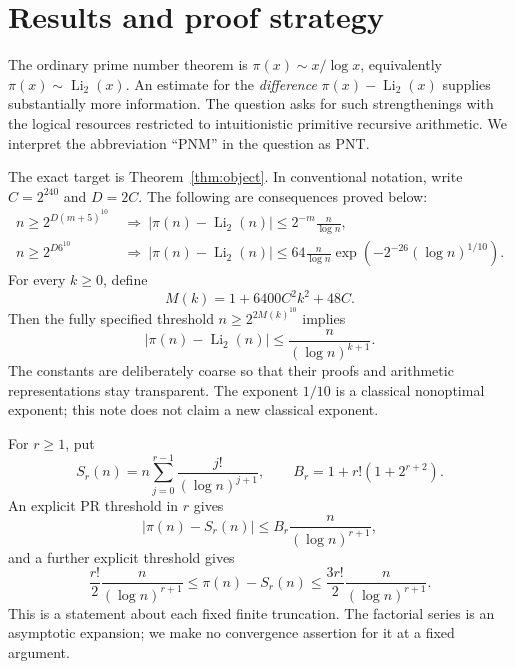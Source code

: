 \documentclass[11pt,letterpaper]{article}
\numberwithin{equation}{section}
\theoremstyle{definition}
\newcommand{\Li}{\operatorname{Li}}
\begin{document}
\begingroup
\small
\setlength{\parskip}{0pt}
\tableofcontents
\endgroup
\newpage
{}

\section{Results and proof strategy}

The ordinary prime number theorem is
$\pi(x)\sim x/\log x$, equivalently $\pi(x)\sim\Li_2(x)$.
An estimate for the \emph{difference} $\pi(x)-\Li_2(x)$ supplies
substantially more information. The question asks for such strengthenings
with the logical resources restricted to intuitionistic primitive recursive
arithmetic. We interpret the abbreviation ``PNM'' in the question as PNT.

The exact target is Theorem~\ref{thm:object}. In conventional notation,
write $C=2^{240}$ and $D=2C$. The following are consequences proved below:
\begin{align*}
 n\ge2^{D(m+5)^{10}}
 &\ \Longrightarrow\
 |\pi(n)-\Li_2(n)|\le2^{-m}\frac n{\log n},\\
 n\ge2^{D6^{10}}
 &\ \Longrightarrow\
 |\pi(n)-\Li_2(n)|\le
 64\frac n{\log n}\exp\!\left(-2^{-26}(\log n)^{1/10}\right).
\end{align*}
For every $k\ge0$, define
\[
 M(k)=1+6400C^2k^2+48C.
\]
Then the fully specified threshold
$n\ge2^{2M(k)^{10}}$ implies
\[
 |\pi(n)-\Li_2(n)|\le \frac n{(\log n)^{k+1}}.
\]
The constants are deliberately coarse so that their proofs and arithmetic
representations stay transparent. The exponent $1/10$ is a classical
nonoptimal exponent; this note does not claim a new classical exponent.

For $r\ge1$, put
\[
 S_r(n)=n\sum_{j=0}^{r-1}\frac{j!}{(\log n)^{j+1}},
 \qquad B_r=1+r!(1+2^{r+2}).
\]
An explicit PR threshold in $r$ gives
\[
 |\pi(n)-S_r(n)|\le B_r\frac n{(\log n)^{r+1}},
\]
and a further explicit threshold gives
\[
 \frac{r!}{2}\frac n{(\log n)^{r+1}}
 \le\pi(n)-S_r(n)
 \le\frac{3r!}{2}\frac n{(\log n)^{r+1}}.
\]
This is a statement about each fixed finite truncation. The factorial
series is an asymptotic expansion; we make no convergence assertion for
it at a fixed argument.
\end{document}
